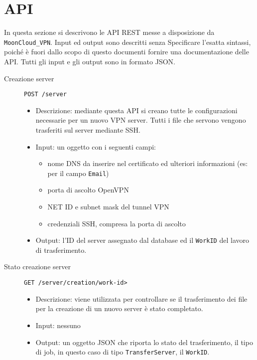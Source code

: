 \section{API}
In questa sezione si descrivono le API REST messe a disposizione da \texttt{MoonCloud\_VPN}.
Input ed output sono descritti senza Specificare l'esatta sintassi, poiché è fuori dallo scopo
di questo documenti fornire una documentazione delle API. Tutti gli input e gli
output sono in formato JSON.

\begin{description}
    \item[Creazione server]\texttt{POST /server}
    \begin{itemize}
        \item Descrizione: mediante questa API si creano tutte le configurazioni necessarie per
        un nuovo VPN server. Tutti i file che servono vengono trasferiti sul server mediante
        SSH.
        \item Input: un oggetto con i seguenti campi:
        \begin{itemize}
            \item nome DNS da inserire nel certificato ed ulteriori informazioni (es: per il campo \texttt{Email})
            \item porta di ascolto OpenVPN
            \item NET ID e subnet mask del tunnel VPN
            \item credenziali SSH, compresa la porta di ascolto 
        \end{itemize}
        \item Output: l'ID del server assegnato dal database ed il \texttt{WorkID} del lavoro di
        trasferimento.
    \end{itemize}

    \item[Stato creazione server]\texttt{GET /server/creation/work-id>}
    \begin{itemize}
        \item Descrizione: viene utilizzata per controllare se il trasferimento dei file
        per la creazione di un nuovo server è stato completato.
        \item Input: nessuno
        \item Output: un oggetto JSON che riporta lo stato del trasferimento, il tipo di job,
        in questo caso di tipo \texttt{TransferServer}, il \texttt{WorkID}.
    \end{itemize}


\end{description}
